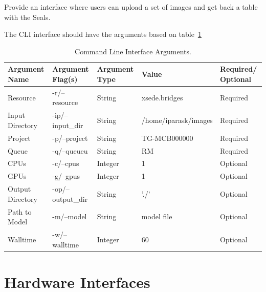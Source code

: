 \documentclass{scrreprt}
\begin{document}
Provide an interface where users can upload a set of images and get back a table 
with the Seals.

The CLI interface should have the arguments based on table~\ref{tab:cli_interface}

\begin{table}[ht]
	\centering
	\begin{tabular}{|p{2.5cm}|p{2.2cm}|p{1.8cm}|p{4cm}|p{2cm}|}
		\hline
		Argument Name    & Argument Flag(s)  & Argument Type & Value                & Required/ Optional\\\hline
		Resource         & -r/--resource     & String        & xsede.bridges        & Required\\\hline
		Input Directory  & -ip/--input\_dir  & String        & /home/iparask/images & Required\\\hline
		Project          & -p/--project      & String        & TG-MCB000000         & Required\\\hline
		Queue            & -q/--queueu       & String        & RM                   & Required\\\hline
		CPUs             & -c/--cpus         & Integer       & 1                    & Optional\\\hline
		GPUs             & -g/--gpus         & Integer       & 1                    & Optional\\\hline
		Output Directory & -op/--output\_dir & String        & './'                 & Optional\\\hline
		Path to Model    & -m/--model        & String        & model file           & Optional\\\hline
		Walltime         & -w/--walltime     & Integer       & 60                   & Optional\\
		\hline
	\end{tabular}
	\caption{Command Line Interface Arguments.\label{tab:cli_interface}}
\end{table}




\section{Hardware Interfaces}

\end{document}
